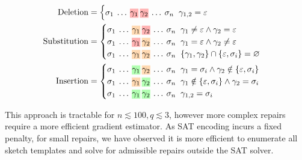 \documentclass[sigplan,review,anonymous,acmsmall]{acmart}\settopmatter{printfolios=false,printccs=false,printacmref=false}
\begin{document}
  \begin{align*}
    \text{Deletion}&=\begin{cases}
    \sigma_{1}\:\ldots\:\text{\hlred{$\gamma_1$}\:\hlred{$\gamma_2$}}\:\ldots\:\sigma_n\hspace{0.2cm}\gamma_{1, 2} = \varepsilon\label{eq:del}
    \end{cases}\\
    \text{Substitution}&=\begin{cases}
    \sigma_{1}\:\ldots\:\text{\hlorange{$\gamma_1$}\:\hlred{$\gamma_2$}}\:\ldots\:\sigma_n\hspace{0.2cm}\gamma_1 \neq \varepsilon \land \gamma_2 = \varepsilon\label{eq:sub1}\\
    \sigma_{1}\:\ldots\:\text{\hlred{$\gamma_1$}\:\hlorange{$\gamma_2$}}\:\ldots\:\sigma_n\hspace{0.2cm}\gamma_1 = \varepsilon \land \gamma_2 \neq \varepsilon\label{eq:sub2}\\
    \sigma_{1}\:\ldots\: \text{\hlorange{$\gamma_1$}\:\hlorange{$\gamma_2$}}\:\ldots\:\sigma_n\hspace{0.2cm}\{\gamma_1, \gamma_2\}\cap\{\varepsilon, \sigma_i\} = \varnothing \label{eq:sub3}
    \end{cases}\\
    \text{Insertion}&=\begin{cases}
    \sigma_{1}\:\ldots\: \text{\hlgreen{$\gamma_1$}\:\hlorange{$\gamma_2$}}\:\ldots\:\sigma_n\hspace{0.2cm}\gamma_1 = \sigma_i \land \gamma_2 \notin \{\varepsilon,  \sigma_i\}\label{eq:ins2}\\
    \sigma_{1}\:\ldots\: \text{\hlorange{$\gamma_1$}\:\hlgreen{$\gamma_2$}}\:\ldots\:\sigma_n\hspace{0.2cm}\gamma_1 \notin \{\varepsilon, \sigma_i\} \land \gamma_2 = \sigma_i\label{eq:ins1}\\
    \sigma_{1}\:\ldots\: \text{\hlgreen{$\gamma_1$}\:\hlgreen{$\gamma_2$}}\:\ldots\:\sigma_n\hspace{0.2cm}\gamma_{1,2} = \sigma_i\label{eq:copy}
    \end{cases}
  \end{align*}

\noindent This approach is tractable for $n \lesssim 100, q \lesssim 3$, however more complex repairs require a more efficient gradient estimator. As SAT encoding incurs a fixed penalty, for small repairs, we have observed it is more efficient to enumerate all sketch templates and solve for admissible repairs outside the SAT solver.
\end{document}
